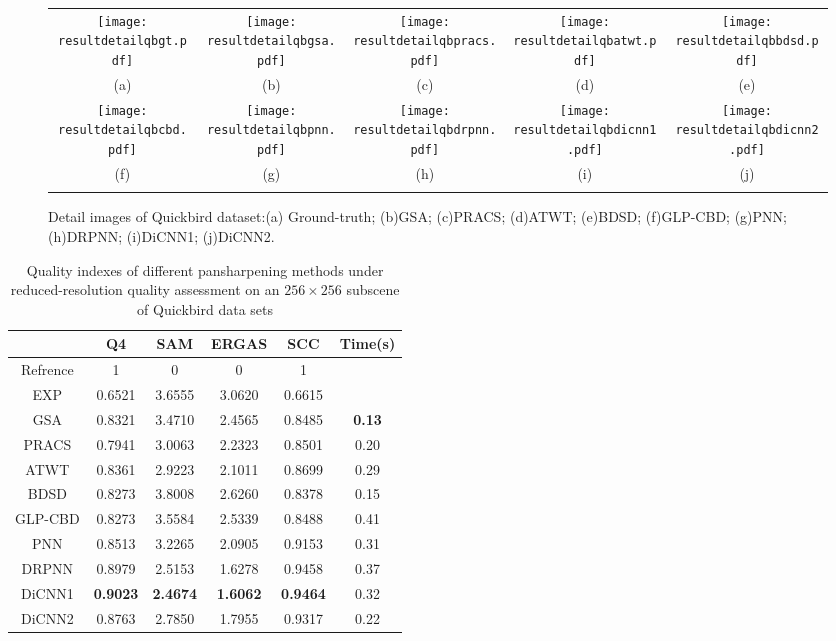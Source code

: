 \documentclass[journal]{IEEEtran}
\begin{document}
\begin{figure*}[t]\scriptsize
\centering
  \begin{tabular}{ccccc}
\texttt{[image: resultdetailqbgt.pdf]} &
\texttt{[image: resultdetailqbgsa.pdf]} &
\texttt{[image: resultdetailqbpracs.pdf]} &
\texttt{[image: resultdetailqbatwt.pdf]}&
\texttt{[image: resultdetailqbbdsd.pdf]} \\
(a) & (b) & (c)  & (d) &  (e)\\
\texttt{[image: resultdetailqbcbd.pdf]} &
\texttt{[image: resultdetailqbpnn.pdf]} &
\texttt{[image: resultdetailqbdrpnn.pdf]} &
\texttt{[image: resultdetailqbdicnn1.pdf]} &
\texttt{[image: resultdetailqbdicnn2.pdf]} \\
  (f) & (g) & (h) &  (i) & (j)  \\
\\
\end{tabular}
\caption{Detail images of Quickbird dataset:(a) Ground-truth;  (b)GSA; (c)PRACS; (d)ATWT; (e)BDSD;  (f)GLP-CBD; (g)PNN; (h)DRPNN; (i)DiCNN1; (j)DiCNN2. }
\label{figure:detail qb}
\end{figure*}

\begin{table}[htp]
\small
\caption{Quality indexes of different pansharpening methods under reduced-resolution quality assessment on an $256\times256$ subscene of Quickbird data sets}
\centering
\begin{tabular}{c|ccccc}
\hline
{}&Q4&SAM& ERGAS &SCC&Time(s)\\
\hline
Refrence&1 &0 &0 &1&{}\\
\hline
\hline
EXP &0.6521 &3.6555 &3.0620 &0.6615 &{}\\
\hline
GSA&0.8321 &3.4710 &2.4565 &0.8485 &\textbf{0.13}\\
\hline
PRACS&0.7941 &3.0063 &2.2323 &0.8501 &0.20\\
\hline
ATWT&0.8361 &2.9223 &2.1011 &0.8699 &0.29\\
\hline
BDSD&0.8273 &3.8008 &2.6260 &0.8378 &0.15\\
\hline
GLP-CBD&0.8273 &3.5584 &2.5339 &0.8488 &0.41\\
\hline
\hline
PNN &0.8513 &3.2265 &2.0905 &0.9153 &0.31\\
\hline
DRPNN &0.8979 &2.5153 &1.6278 &0.9458 &0.37\\
\hline
DiCNN1 &\textbf{0.9023} &\textbf{2.4674} &\textbf{1.6062} &\textbf{0.9464} &0.32\\
\hline
DiCNN2 &0.8763 &2.7850 &1.7955 &0.9317&0.22\\
\hline
\end{tabular}
\label{table:reduceqb}
\end{table}
\end{document}
